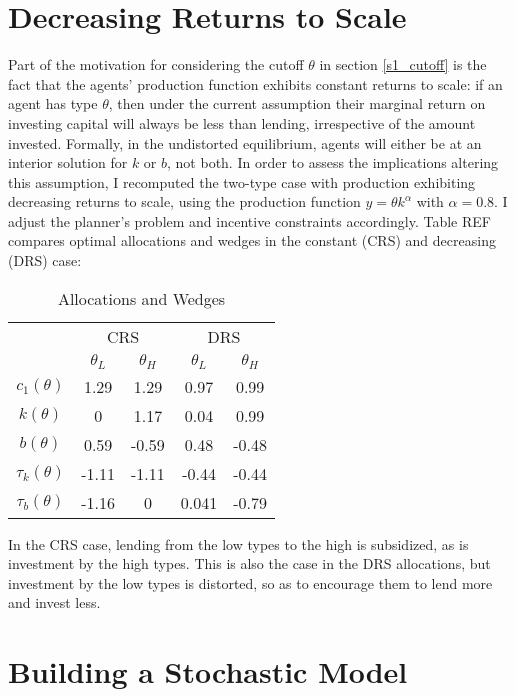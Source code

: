 \documentclass[11pt]{article}
\begin{document}
\section{Decreasing Returns to Scale}

Part of the motivation for considering the cutoff \( \theta \) in section \ref{s1_cutoff} is the fact that the agents' production function exhibits constant returns to scale: if an agent has type \( \theta \), then under the current assumption their marginal return on investing capital will always be less than lending, irrespective of the amount invested. Formally, in the undistorted equilibrium, agents will either be at an interior solution for \( k \) or \( b \), not both. In order to assess the implications altering this assumption, I recomputed the two-type case with production exhibiting decreasing returns to scale, using the production function \( y = \theta k^\alpha \) with  \( \alpha = 0.8 \). I adjust the planner's problem and incentive constraints accordingly. Table REF compares optimal allocations and wedges in the constant (CRS) and decreasing (DRS) case:

\begin{table}[!htbp] 
\centering 
\caption{Allocations and Wedges} 
    \begin{tabular}{c | c c | c c }  \hline
        & \multicolumn{2}{c|}{CRS} & \multicolumn{2}{c}{DRS} \\
        & \( \theta_L \) & \( \theta_H \) & \( \theta_L \) & \( \theta_H \) \\ \hline
        \( c_1(\theta) \) & 1.29 & 1.29 & 0.97 & 0.99 \\
        \( k(\theta) \) & 0 & 1.17 & 0.04 & 0.99 \\
        \( b(\theta) \) & 0.59 & -0.59 & 0.48 & -0.48 \\ \hline
        \( \tau_k(\theta) \) & -1.11 & -1.11 & -0.44 & -0.44 \\
        \( \tau_b(\theta) \) & -1.16 & 0 & 0.041 & -0.79
    \end{tabular} 
\label{crs_drs} 
\end{table}

In the CRS case, lending from the low types to the high is subsidized, as is investment by the high types. This is also the case in the DRS allocations, but investment by the low types is distorted, so as to encourage them to lend more and invest less. 

\section{Building a Stochastic Model}
\end{document}
